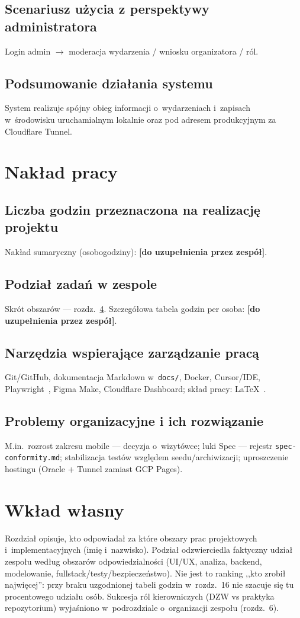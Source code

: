 \documentclass{sprz}
\begin{document}
\section{Scenariusz użycia z perspektywy administratora}
Login admin $\rightarrow$ moderacja wydarzenia / wniosku organizatora / ról.
\section{Podsumowanie działania systemu}
System realizuje spójny obieg informacji o~wydarzeniach i~zapisach w~środowisku uruchamialnym lokalnie oraz pod adresem produkcyjnym za Cloudflare Tunnel.

\chapter{Nakład pracy}
\section{Liczba godzin przeznaczona na realizację projektu}
Nakład sumaryczny (osobogodziny): \textbf{[do uzupełnienia przez zespół]}.
\section{Podział zadań w zespole}
Skrót obszarów --- rozdz.~\ref{ch:wklad}. Szczegółowa tabela godzin per osoba: \textbf{[do uzupełnienia przez zespół]}.
\section{Narzędzia wspierające zarządzanie pracą}
Git/GitHub, dokumentacja Markdown w~\texttt{docs/}, Docker, Cursor/IDE, Playwright~\cite{playwright:docs}, Figma Make, Cloudflare Dashboard; skład pracy: \LaTeX{}~\cite{latex:project}.
\section{Problemy organizacyjne i ich rozwiązanie}
M.in.\ rozrost zakresu mobile --- decyzja o~wizytówce; luki Spec --- rejestr \texttt{spec-conformity.md}; stabilizacja testów względem seedu/archiwizacji; uproszczenie hostingu (Oracle + Tunnel zamiast GCP Pages).

\chapter{Wkład własny}
\label{ch:wklad}
Rozdział opisuje, kto odpowiadał za które obszary prac projektowych i~implementacyjnych (imię i~nazwisko). Podział odzwierciedla faktyczny udział zespołu według obszarów odpowiedzialności (UI/UX, analiza, backend, modelowanie, fullstack/testy/bezpieczeństwo). Nie jest to ranking ,,kto zrobił najwięcej'': przy braku uzgodnionej tabeli godzin w~rozdz.~16 nie szacuje się tu procentowego udziału osób. Sukcesja ról kierowniczych (DZW vs praktyka repozytorium) wyjaśniono w~podrozdziale o~organizacji zespołu (rozdz.~6).
\end{document}
